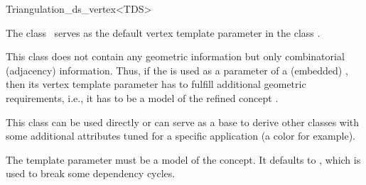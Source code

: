 \begin{ccRefClass}{Triangulation_ds_vertex<TDS>}

\ccDefinition

The class \ccRefName\ serves as the default vertex template parameter in the
class .

This class does not contain any geometric information but only combinatorial
(adjacency) information. Thus, if the  is
used as a parameter of a (embedded) , then its vertex template parameter
has to fulfill additional geometric requirements, {i.e.}, it has to be a
model of the refined concept .

This class can be used directly or can serve as a base to derive other classes
with some additional attributes tuned for a specific application (a color for
example).


\ccParameters

The template parameter  must be a model of the
 concept. It defaults to , which is
used to break some dependency cycles.

\ccIsModel


\ccSeeAlso


\end{ccRefClass}
